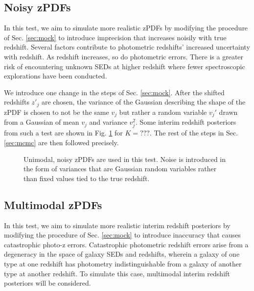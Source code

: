 \documentclass[preprint]{aastex}
\begin{document}

\clearpage
\subsection{Noisy zPDFs}
\label{sec:noisy}

In this test, we aim to simulate more realistic zPDFs by modifying the 
procedure of Sec. \ref{sec:mock} to introduce imprecision that increases 
noisily with true redshift.  Several factors contribute to photometric 
redshifts' increased uncertainty with redshift.  As redshift increases, so do 
photometric errors.  There is a greater risk of encountering unknown SEDs at 
higher redshift where fewer spectroscopic explorations have been conducted.  

We introduce one change in the steps of Sec. \ref{sec:mock}.  After the shifted 
redshifts $z'_{j}$ are chosen, the variance of the Gaussian describing the 
shape of the zPDF is chosen to not be the same $v_{j}$ but rather a random 
variable $v_{j}'$ drawn from a Gaussian of mean $v_{j}$ and variance 
$v_{j}^{2}$.  Some interim redshift posteriors from such a test are shown in 
Fig. \ref{fig:noisypzs} for $K=???$.  The rest of the steps in Sec. 
\ref{sec:mcmc} are then followed precisely.

\begin{figure}
\caption{Unimodal, noisy zPDFs are used in this test.  Noise is introduced in 
the form of variances that are Gaussian random variables rather than fixed 
values tied to the true redshift.}
\label{fig:noisypzs}
\end{figure}


\clearpage
\subsection{Multimodal zPDFs}
\label{sec:multi}

In this test, we aim to simulate more realistic interim redshift posteriors by 
modifying the procedure of Sec. \ref{sec:mock} to introduce inaccuracy that 
causes catastrophic photo-z errors.  Catastrophic photometric redshift errors 
arise from a degeneracy in the space of galaxy SEDs and redshifts, wherein a 
galaxy of one type at one redshift has photometry indistinguishable from a 
galaxy of another type at another redshift.  To simulate this case, multimodal 
interim redshift posteriors will be considered.
\end{document}
